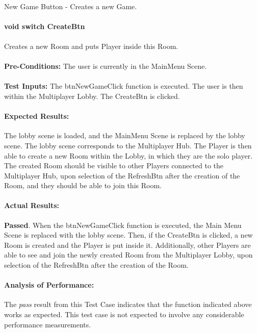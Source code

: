 \documentclass{article}
\begin{document}
    \paragraph{} New Game Button - Creates a new Game.
    \paragraph{}\textbf{void switch CreateBtn}
    \paragraph{} Creates a new Room and puts Player inside this Room.
    \paragraph{}\textbf{Pre-Conditions:} The user is currently in the MainMenu Scene.
    \paragraph{}\textbf{Test Inputs:} The btnNewGameClick function is executed. The user is then within the Multiplayer Lobby. The CreateBtn is clicked. 
    \paragraph{Expected Results:} The lobby scene is loaded, and the MainMenu Scene is replaced by the lobby scene. The lobby scene corresponds to the Multiplayer Hub. The Player is then able to create a new Room within the Lobby, in which they are the solo player. The created Room should be visible to other Players connected to the Multiplayer Hub, upon selection of the RefreshBtn after the creation of the Room, and they should be able to join this Room.
    \paragraph{Actual Results:} \textbf{Passed}. When the btnNewGameClick function is executed, the Main Menu Scene is replaced with the lobby scene. Then, if the CreateBtn is clicked, a new Room is created and the Player is put inside it. Additionally, other Players are able to see and join the newly created Room from the Multiplayer Lobby, upon selection of the RefreshBtn after the creation of the Room.
    \paragraph{Analysis of Performance:} The \emph{pass} result from this Test Case indicates that the function indicated above works as expected. This test case is not expected to involve any considerable performance measurements.
    
\end{document}

